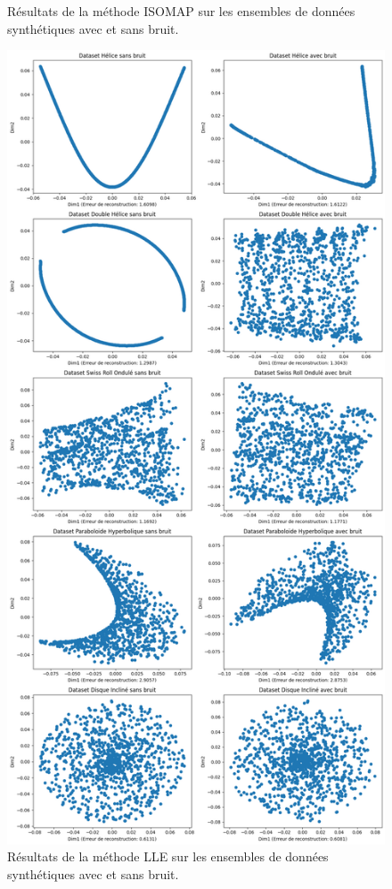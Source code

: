 \documentclass[unnumsec,webpdf,modern,large]{projet_manifold}%
\theoremstyle{thmstyleone}%
\theoremstyle{thmstyletwo}%
\theoremstyle{thmstylethree}%
\begin{document}
\begin{appendices}
\begin{figure}[b]
    \caption{Résultats de la méthode ISOMAP sur les ensembles de données synthétiques avec et sans bruit.}
    \label{fig:resultats_ISOMAP}
\end{figure}
\vspace*{\fill}

\newpage
\thispagestyle{empty}
\vspace*{\fill}
\begin{figure}[b]
    \centering
    \includegraphics[width=\textwidth,height=0.8\textheight,keepaspectratio]{LLE.png}
    \caption{Résultats de la méthode LLE sur les ensembles de données synthétiques avec et sans bruit.}
    \label{fig:resultats_LLE}
\end{figure}
\vspace*{\fill}


\end{appendices}
\end{document}
